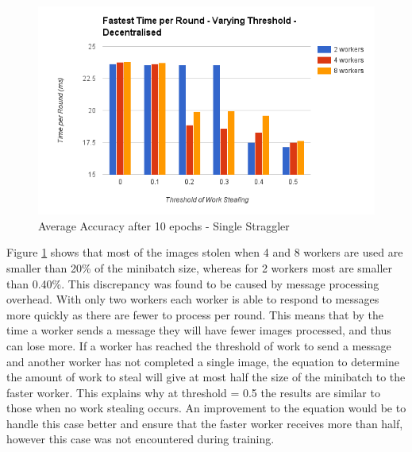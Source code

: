\documentclass[12pt]{article}
\begin{document}
\begin{figure}[H]
  \centering
  \includegraphics[width=6in]{FastestThresholdDecentralised}
  \caption[]{Average Accuracy after 10 epochs - Single Straggler}
  \label{FastestThresholdDecentralised}
\end{figure}

Figure \ref{FastestThresholdDecentralised} shows that most of the images stolen when 4 and 8 workers are used are smaller than 20\% of the minibatch size, whereas for 2 workers most are smaller than 0.40\%. This discrepancy was found to be caused by message processing overhead. With only two workers each worker is able to respond to messages more quickly as there are fewer to process per round. This means that by the time a worker sends a  message they will have fewer images processed, and thus can lose more.
\newline
\newline
If a worker has reached the threshold of work to send a  message and another worker has not completed a single image, the equation to determine the amount of work to steal will give at most half the size of the minibatch to the faster worker. This explains why at threshold = 0.5 the results are similar to those when no work stealing occurs. An improvement to the equation would be to handle this case better and ensure that the faster worker receives more than half, however this case was not encountered during training.
\end{document}
